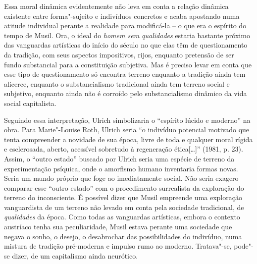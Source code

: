 Essa moral dinâmica evidentemente não leva em conta a relação dinâmica
existente entre forma"-sujeito e indivíduos concretos e acaba apostando
numa atitude individual perante a realidade para modificá-la -- o que
era o espírito do tempo de Musil. Ora, o ideal do \emph{homem
sem qualidades} estaria bastante próximo das vanguardas artísticas do
início do século  no que elas têm de questionamento da tradição, com
seus aspectos impositivos, rijos, enquanto pretensão de ser fundo
substancial para a constituição subjetiva. Mas é preciso levar em conta
que esse tipo de questionamento só encontra terreno enquanto a tradição
ainda tem alicerce, enquanto o substancialismo tradicional ainda tem
terreno social e subjetivo, enquanto ainda não é corroído pelo
substancialismo dinâmico da vida social capitalista.

Seguindo essa interpretação, Ulrich simbolizaria o ``espírito lúcido e
moderno'' na obra. Para Marie"-Louise Roth, Ulrich seria ``o indivíduo
potencial motivado que tenta compreender a novidade de sua época, livre
de toda e qualquer moral rígida e esclerosada, aberto, acessível
sobretudo à regeneração ética[\ldots{}]'' (1981, p. 23). Assim, o ``outro
estado'' buscado por Ulrich seria uma espécie de terreno da
experimentação psíquica, onde o amorfismo humano inventaria formas
novas. Seria um mundo próprio que foge ao imediatamente social. Não
seria exagero comparar esse ``outro estado'' com o procedimento
surrealista da exploração do terreno do inconsciente. É possível dizer
que Musil empreende uma exploração vanguardista de um terreno não levado em
conta pela sociedade tradicional, de \emph{qualidades} da época. Como
todas as vanguardas artísticas, embora o contexto austríaco tenha sua
peculiaridade, Musil estava perante uma sociedade que negava o sonho, o
desejo, o desabrochar das possibilidades do indivíduo, numa mistura de
tradição pré-moderna e impulso rumo ao moderno. Tratava"-se, pode"-se
dizer, de um capitalismo ainda neurótico.

